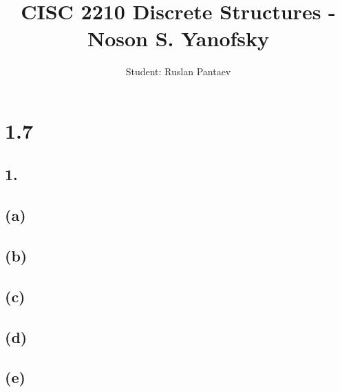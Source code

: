 \documentclass[11pt]{article}
\begin{document}
\title{CISC 2210 Discrete Structures - Noson S. Yanofsky}
\author{Student: Ruslan Pantaev}
\maketitle

\section*{1.7}
%
%
\subsection*{1.}
\begin{center}

\end{center}

\subsection*{(a)}
\begin{center}

\hfill \break

\end{center}

\subsection*{(b)}
\begin{center}

\hfill \break

\end{center}

\subsection*{(c)}
\begin{center}

\hfill \break

\end{center}

\subsection*{(d)}
\begin{center}

\hfill \break

\end{center}

\subsection*{(e)}
\begin{center}

\hfill \break

\end{center}
%
%
\end{document}
